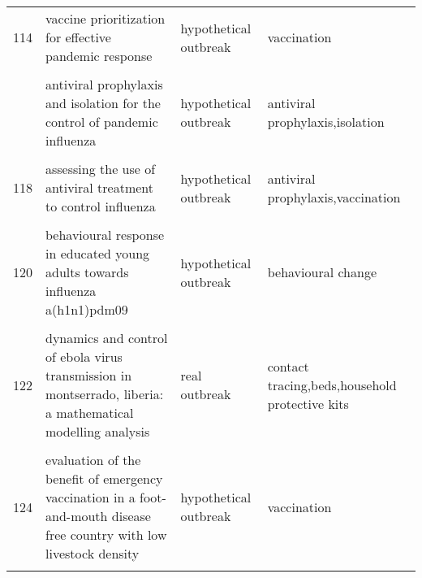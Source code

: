 \documentclass[
]{article}
\begin{document}
\begin{landscape}
\begin{longtable}{l>{\raggedright\arraybackslash}p{3cm}l>{\raggedright\arraybackslash}p{8cm}}
114 & vaccine prioritization for effective pandemic response & hypothetical outbreak & vaccination\\
\cellcolor{gray!6}{115} & \cellcolor{gray!6}{a mathematical study of a tb model with treatment interruptions and two latent periods} & \cellcolor{gray!6}{hypothetical outbreak} & \cellcolor{gray!6}{treatment}\\
\addlinespace
116 & antiviral prophylaxis and isolation for the control of pandemic influenza & hypothetical outbreak & antiviral prophylaxis,isolation\\
\cellcolor{gray!6}{117} & \cellcolor{gray!6}{assessing the impact of travel restrictions on international spread of the 2014 west african ebola epidemic} & \cellcolor{gray!6}{real outbreak} & \cellcolor{gray!6}{travel restriction}\\
118 & assessing the use of antiviral treatment to control influenza & hypothetical outbreak & antiviral prophylaxis,vaccination\\
\cellcolor{gray!6}{119} & \cellcolor{gray!6}{behavior in the time of cholera: evidence from the 2008-2009 cholera outbreak in zimbabwe} & \cellcolor{gray!6}{real outbreak} & \cellcolor{gray!6}{water treatment}\\
120 & behavioural response in educated young adults towards influenza a(h1n1)pdm09 & hypothetical outbreak & behavioural change\\
\addlinespace
\cellcolor{gray!6}{121} & \cellcolor{gray!6}{cover your cough! quantifying the benefits of a localized healthy behavior intervention on flu epidemics in washington dc} & \cellcolor{gray!6}{hypothetical outbreak} & \cellcolor{gray!6}{behavioural change,vaccination}\\
122 & dynamics and control of ebola virus transmission in montserrado, liberia: a mathematical modelling analysis & real outbreak & contact tracing,beds,household protective kits\\
\cellcolor{gray!6}{123} & \cellcolor{gray!6}{estimating the effectiveness of early control measures through school absenteeism surveillance in observed outbreaks at rural schools in hubei, china} & \cellcolor{gray!6}{real outbreak} & \cellcolor{gray!6}{school absenteeism surveillance}\\
124 & evaluation of the benefit of emergency vaccination in a foot-and-mouth disease free country with low livestock density & hypothetical outbreak & vaccination\\
\cellcolor{gray!6}{125} & \cellcolor{gray!6}{modeling the dynamics of oral poliovirus vaccine cessation} & \cellcolor{gray!6}{hypothetical outbreak} & \cellcolor{gray!6}{vaccination}\\

\end{longtable}
\end{landscape}
\end{document}
